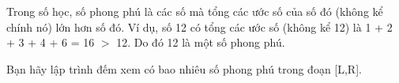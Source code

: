 Trong số học, số phong phú là các số mà tổng các ước số của số đó (không kể chính nó) lớn hơn số đó. Ví dụ, số 12 có tổng các ước số (không kể 12) là 1 + 2 + 3 + 4 + 6 = 16 $>$ 12. Do đó 12 là một số phong phú.  

   Bạn hãy lập trình đếm xem có bao nhiêu số phong phú trong đoạn [L,R].